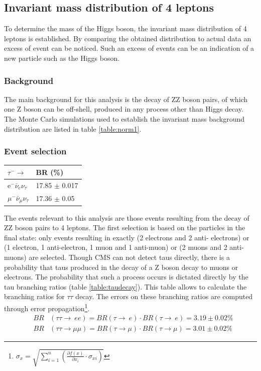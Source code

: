 \documentclass[a4paper,12pt]{article}
\begin{document}
\subsection{Invariant mass distribution of 4 leptons}
To determine the mass of the Higgs boson, the invariant mass distribution of 4 leptons is established. By comparing the obtained distribution to actual data an excess of event can be noticed. Such an excess of events can be an indication of a new particle such as the Higgs boson.




\subsubsection{Background}
The main background for this analysis is the decay of ZZ boson pairs, of which one Z boson can be off-shell, produced in any process other than Higgs decay. The Monte Carlo simulations used to establish the invariant mass background distribution are listed in table \ref{table:norm1}.




\subsubsection{Event selection}
\begin{floatingtable}[r]{
	\begin{tabular}{l | l}
		\boldmath$\tau^- \rightarrow$			& \textbf{BR (\%)}\\
		\hline
		e$^- \bar\nu_e \nu_\tau$			& 17.85 $\pm$ 0.017\\
		$\mu^- \bar\nu_{\mu} \nu_\tau$		& 17.36 $\pm$ 0.05\\
	\end{tabular}}
	\caption{\emph{Branching ratios for leptonic tau decay \cite{taubr}.}}
	\label{table:taudecay}
\end{floatingtable}
The events relevant to this analysis are those events resulting from the decay of ZZ boson pairs to 4 leptons. The first selection is based on the particles in the final state: only events resulting in exactly (2 electrons and 2 anti- electrons) or (1 electron, 1 anti-electron, 1 muon and 1 anti-muon) or (2 muons and 2 anti-muons) are selected. Though CMS can not detect taus directly, there is a probability that taus produced in the decay of a Z boson decay to muons or electrons. The probability that such a process occurs is dictated directly by the tau branching ratios (table \ref{table:taudecay}). This table allows to calculate the branching ratios for $\tau\tau$ decay. The errors on these branching ratios are computed through error propagation\footnote{
$
\sigma_x = \sqrt{\sum\limits_{i=1}^{n} \left ( \frac{\partial f(x)}{\partial x_i} \cdot \sigma_{xi} \right)}
$
}.
\begin{eqnarray}
	&BR&(\tau\tau\rightarrow\ ee) = BR(\tau\rightarrow\ e) \cdot BR(\tau\rightarrow\ e) = 3.19\pm0.02\%\\
	&BR&(\tau\tau\rightarrow\mu\mu) = BR(\tau\rightarrow\mu) \cdot BR(\tau\rightarrow\mu) = 3.01\pm0.02\%
\end{eqnarray}
\end{document}
